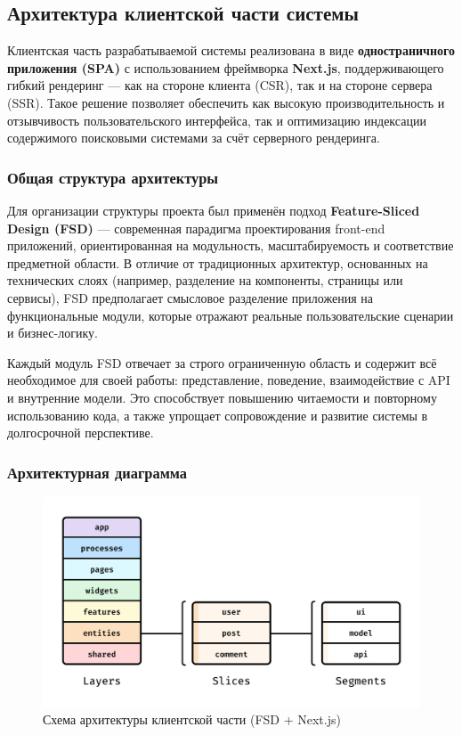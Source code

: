 \subsection{Архитектура клиентской части системы}

Клиентская часть разрабатываемой системы реализована в виде \textbf{одностраничного приложения (SPA)} с использованием фреймворка \textbf{Next.js}, поддерживающего гибкий рендеринг — как на стороне клиента (CSR), так и на стороне сервера (SSR). Такое решение позволяет обеспечить как высокую производительность и отзывчивость пользовательского интерфейса, так и оптимизацию индексации содержимого поисковыми системами за счёт серверного рендеринга.

\subsubsection{Общая структура архитектуры}

Для организации структуры проекта был применён подход \textbf{Feature-Sliced Design (FSD)} — современная парадигма проектирования front-end приложений, ориентированная на модульность, масштабируемость и соответствие предметной области. В отличие от традиционных архитектур, основанных на технических слоях (например, разделение на компоненты, страницы или сервисы), FSD предполагает смысловое разделение приложения на функциональные модули, которые отражают реальные пользовательские сценарии и бизнес-логику.

Каждый модуль FSD отвечает за строго ограниченную область и содержит всё необходимое для своей работы: представление, поведение, взаимодействие с API и внутренние модели. Это способствует повышению читаемости и повторному использованию кода, а также упрощает сопровождение и развитие системы в долгосрочной перспективе.

\subsubsection{Архитектурная диаграмма}

\begin{figure}[H]
\centering
\includegraphics[width=0.7\linewidth]{static/fsdImage}
\caption{Схема архитектуры клиентской части (FSD + Next.js)}
\end{figure}

